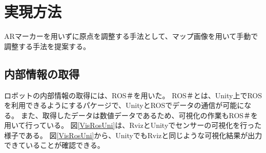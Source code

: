 \chapter{実現方法}\label{chap:method}

ARマーカーを用いずに原点を調整する手法として、マップ画像を用いて手動で調整する手法を提案する。


\section{内部情報の取得}

ロボットの内部情報の取得には、ROS＃を用いた。
ROS＃とは、Unity上でROSを利用できるようにするパケージで、UnityとROSでデータの通信が可能になる。
また、取得したデータは数値データであるため、可視化の作業もROS＃を用いて行っている。
図\ref{VisRosUni}は、RvizとUnityでセンサーの可視化を行った様子である。
図\ref{VisRosUni}から、UnityでもRvizと同じような可視化結果が出力できていることが確認できる。


